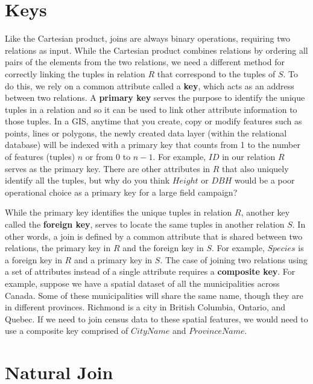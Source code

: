 \documentclass[
]{book}
\begin{document}
\section{Keys}\label{keys}

Like the Cartesian product, joins are always binary operations, requiring two relations as input. While the Cartesian product combines relations by ordering all pairs of the elements from the two relations, we need a different method for correctly linking the tuples in relation \(R\) that correspond to the tuples of \(S\). To do this, we rely on a common attribute called a \textbf{key}, which acts as an address between two relations. A \textbf{primary key} serves the purpose to identify the unique tuples in a relation and so it can be used to link other attribute information to those tuples. In a GIS, anytime that you create, copy or modify features such as points, lines or polygons, the newly created data layer (within the relational database) will be indexed with a primary key that counts from 1 to the number of features (tuples) \(n\) or from 0 to \(n-1\). For example, \(ID\) in our relation \(R\) serves as the primary key. There are other attributes in \(R\) that also uniquely identify all the tuples, but why do you think \(Height\) or \(DBH\) would be a poor operational choice as a primary key for a large field campaign?

While the primary key identifies the unique tuples in relation \(R\), another key called the \textbf{foreign key}, serves to locate the same tuples in another relation \(S\). In other words, a join is defined by a common attribute that is shared between two relations, the primary key in \(R\) and the foreign key in \(S\). For example, \(Species\) is a foreign key in \(R\) and a primary key in \(S\). The case of joining two relations using a set of attributes instead of a single attribute requires a \textbf{composite key}. For example, suppose we have a spatial dataset of all the municipalities across Canada. Some of these municipalities will share the same name, though they are in different provinces. Richmond is a city in British Columbia, Ontario, and Quebec. If we need to join census data to these spatial features, we would need to use a composite key comprised of \(CityName\) and \(ProvinceName\).

\section{Natural Join}\label{natural-join}
\end{document}
